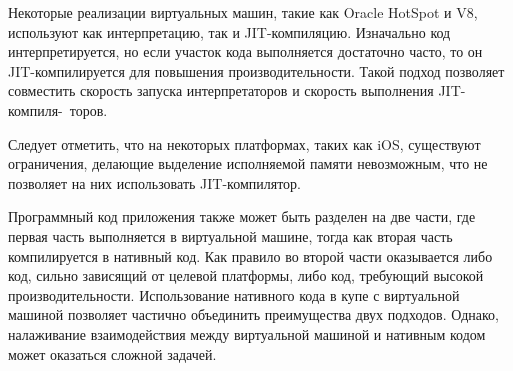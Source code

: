 Некоторые реализации виртуальных машин, такие как Oracle HotSpot и V8, используют как интерпретацию, так и JIT-компиляцию. 
Изначально код интерпретируется, но если участок кода выполняется достаточно часто, то он JIT-компилируется для повышения производительности. 
Такой подход позволяет совместить скорость запуска интерпретаторов и скорость выполнения JIT-компиля-~торов.

Следует отметить, что на некоторых платформах, таких как iOS, существуют ограничения, делающие выделение исполняемой памяти невозможным, что не позволяет на них использовать JIT-компилятор. \cite{IOSJIT}

Программный код приложения также может быть разделен на две части, где первая часть выполняется в виртуальной машине, тогда как вторая часть компилируется в нативный код. 
Как правило во второй части оказывается либо код, сильно зависящий от целевой платформы, либо код, требующий высокой производительности.
Использование нативного кода в купе с виртуальной машиной позволяет частично объединить преимущества двух подходов. 
Однако, налаживание взаимодействия между виртуальной машиной и нативным кодом может оказаться сложной задачей.
